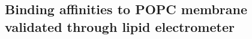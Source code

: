 \documentclass[aip,jcp,twocolumn]{revtex4}
\begin{document}
%
%


\subsection{Binding affinities to POPC membrane validated through lipid electrometer}
\end{document}
